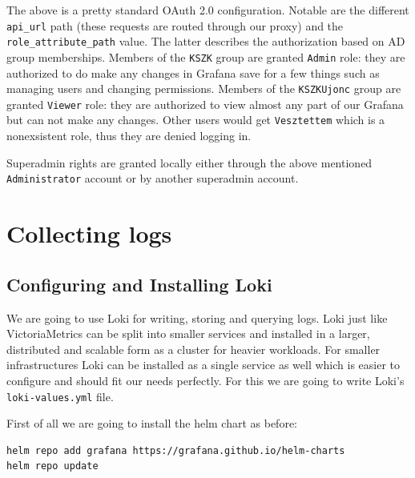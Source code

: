 The above is a pretty standard OAuth 2.0 configuration. Notable are the
different \verb+api_url+ path (these requests are routed through our proxy) and
the \verb+role_attribute_path+ value. The latter describes the authorization
based on AD group memberships. Members of the \verb+KSZK+ group are granted
\verb+Admin+ role: they are authorized to do make any changes in Grafana save
for a few things such as managing users and changing permissions. Members of
the \verb+KSZKUjonc+ group are granted \verb+Viewer+ role: they are authorized
to view almost any part of our Grafana but can not make any changes. Other
users would get \verb+Vesztettem+ which is a nonexsistent role, thus they are
denied logging in.

Superadmin rights are granted locally either through the above mentioned
\verb+Administrator+ account or by another superadmin account.

\section{Collecting logs}

\subsection{Configuring and Installing Loki}

We are going to use Loki for writing, storing and querying logs. Loki just like
VictoriaMetrics can be split into smaller services and installed in a larger,
distributed and scalable form as a cluster for heavier workloads. For smaller
infrastructures Loki can be installed as a single service as well which is
easier to configure and should fit our needs perfectly. For this we are going
to write Loki's \verb+loki-values.yml+ file.

First of all we are going to install the helm chart as before:

\begin{lstlisting}[language=bash,caption=Installing Loki's helm chart]
helm repo add grafana https://grafana.github.io/helm-charts
helm repo update
\end{lstlisting}

